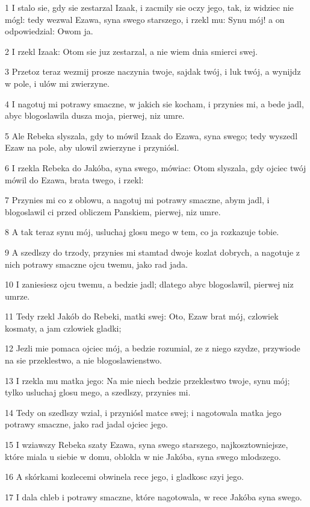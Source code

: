 \par 1 I stalo sie, gdy sie zestarzal Izaak, i zacmily sie oczy jego, tak, iz widziec nie mógl: tedy wezwal Ezawa, syna swego starszego, i rzekl mu: Synu mój! a on odpowiedzial: Owom ja.
\par 2 I rzekl Izaak: Otom sie juz zestarzal, a nie wiem dnia smierci swej.
\par 3 Przetoz teraz wezmij prosze naczynia twoje, sajdak twój, i luk twój, a wynijdz w pole, i ulów mi zwierzyne.
\par 4 I nagotuj mi potrawy smaczne, w jakich sie kocham, i przynies mi, a bede jadl, abyc blogoslawila dusza moja, pierwej, niz umre.
\par 5 Ale Rebeka slyszala, gdy to mówil Izaak do Ezawa, syna swego; tedy wyszedl Ezaw na pole, aby ulowil zwierzyne i przyniósl.
\par 6 I rzekla Rebeka do Jakóba, syna swego, mówiac: Otom slyszala, gdy ojciec twój mówil do Ezawa, brata twego, i rzekl:
\par 7 Przynies mi co z oblowu, a nagotuj mi potrawy smaczne, abym jadl, i blogoslawil ci przed obliczem Panskiem, pierwej, niz umre.
\par 8 A tak teraz synu mój, usluchaj glosu mego w tem, co ja rozkazuje tobie.
\par 9 A szedlszy do trzody, przynies mi stamtad dwoje kozlat dobrych, a nagotuje z nich potrawy smaczne ojcu twemu, jako rad jada.
\par 10 I zaniesiesz ojcu twemu, a bedzie jadl; dlatego abyc blogoslawil, pierwej niz umrze.
\par 11 Tedy rzekl Jakób do Rebeki, matki swej: Oto, Ezaw brat mój, czlowiek kosmaty, a jam czlowiek gladki;
\par 12 Jezli mie pomaca ojciec mój, a bedzie rozumial, ze z niego szydze, przywiode na sie przeklestwo, a nie blogoslawienstwo.
\par 13 I rzekla mu matka jego: Na mie niech bedzie przeklestwo twoje, synu mój; tylko usluchaj glosu mego, a szedlszy, przynies mi.
\par 14 Tedy on szedlszy wzial, i przyniósl matce swej; i nagotowala matka jego potrawy smaczne, jako rad jadal ojciec jego.
\par 15 I wziawszy Rebeka szaty Ezawa, syna swego starszego, najkosztowniejsze, które miala u siebie w domu, oblokla w nie Jakóba, syna swego mlodszego.
\par 16 A skórkami kozlecemi obwinela rece jego, i gladkosc szyi jego.
\par 17 I dala chleb i potrawy smaczne, które nagotowala, w rece Jakóba syna swego.

